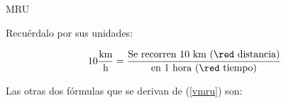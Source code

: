 \documentclass[%
final,
total,
slideBW,
colorBG,
pdf,
accumulate,
]{prosper}
\begin{document}
\begin{slide}{MRU}
% 

Recu\'erdalo por sus unidades:


\begin{equation*}
10\frac{\text{km}}{\text{h}} =
\frac{\text{Se recorren 10 km ({\red distancia})}}
{\text{en 1 hora ({\red tiempo})}}
\end{equation*}
                                                               
 
Las otras dos f\'ormulas que se derivan de (\ref{vmru}) son:

{\large \xmru \\ \tmru}
                                                              
\end{slide}
\end{document}
